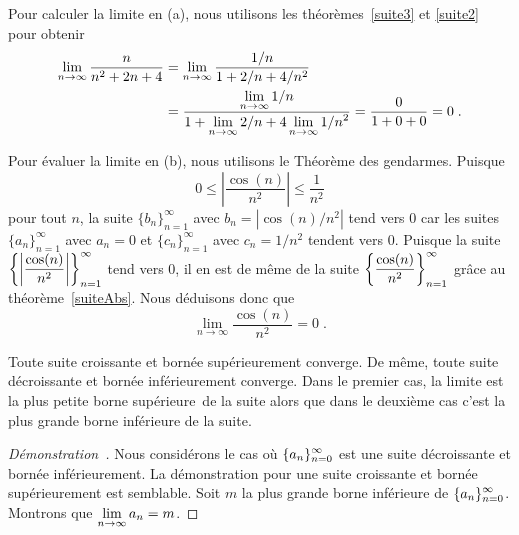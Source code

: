 {\begin{egg}
Pour calculer la limite en (a), nous utilisons les
théorèmes~\ref{suite3} et \ref{suite2} pour obtenir
\begin{align*}
\lim_{n\rightarrow \infty} \frac{n}{n^2+2n+4}
&= \lim_{n\rightarrow \infty} \frac{1/n}{1+2/n+4/n^2} \\
&= \frac{\displaystyle \lim_{n\rightarrow \infty} 1/n}
{\displaystyle 1 + \lim_{n\rightarrow \infty} 2/n
+ 4 \lim_{n\rightarrow \infty} 1/n^2} = \frac{0}{1+0+0} = 0 \; .
\end{align*}

Pour évaluer la limite en (b), nous utilisons le
Théorème des gendarmes.  Puisque
\[
0 \leq \left| \frac{\cos(n)}{n^2} \right| \leq \frac{1}{n^2}
\]
pour tout $n$, la suite $\{b_n\}_{n=1}^\infty$ avec $b_n = |\cos(n)/n^2|$
tend vers $0$ car les suites $\{a_n\}_{n=1}^\infty$ avec $a_n = 0$ et
$\{c_n\}_{n=1}^\infty$ avec $c_n = 1/n^2$ tendent vers $0$.  Puisque la
suite
$\displaystyle \left\{ \left| \frac{\cos(n)}{n^2} \right|\right\}_{n=1}^\infty$
tend vers $0$, il en est de même de la suite 
$\displaystyle \left\{\frac{\cos(n)}{n^2}\right\}_{n=1}^\infty$ grâce
au théorème~\ref{suiteAbs}.  Nous déduisons donc que
\[
\lim_{n\rightarrow \infty} \frac{\cos(n)}{n^2} = 0 \; .
\]
\end{egg}

\begin{theorem}[+\theory]
Toute suite croissante et bornée supérieurement converge.  De même,
toute suite décroissante et bornée inférieurement converge.  Dans le
premier cas, la limite est la plus petite borne
supérieure\footnotemark\ de la suite alors que dans le deuxième cas
c'est la plus grande borne inférieure de la suite.
\label{suiteBORN}
\end{theorem}


\begin{proof}[Démonstration\ \theory]
Nous considérons le cas où $\displaystyle \{ a_n \}_{n=0}^\infty$ est une
suite décroissante et bornée inférieurement.  La démonstration pour
une suite croissante et bornée supérieurement est semblable.  Soit $m$
la plus grande borne inférieure de
$\displaystyle \{ a_n \}_{n=0}^\infty$.  Montrons que
$\displaystyle \lim_{n\to \infty} a_n = m$.


\end{proof}}
